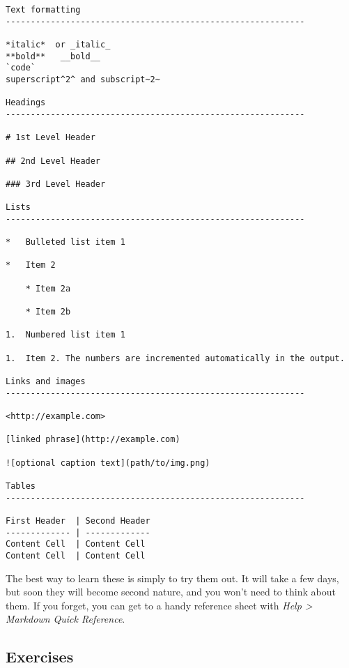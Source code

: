 \documentclass[]{book}
\begin{document}
\begin{verbatim}
Text formatting 
------------------------------------------------------------

*italic*  or _italic_
**bold**   __bold__
`code`
superscript^2^ and subscript~2~

Headings
------------------------------------------------------------

# 1st Level Header

## 2nd Level Header

### 3rd Level Header

Lists
------------------------------------------------------------

*   Bulleted list item 1

*   Item 2

    * Item 2a

    * Item 2b

1.  Numbered list item 1

1.  Item 2. The numbers are incremented automatically in the output.

Links and images
------------------------------------------------------------

<http://example.com>

[linked phrase](http://example.com)

![optional caption text](path/to/img.png)

Tables 
------------------------------------------------------------

First Header  | Second Header
------------- | -------------
Content Cell  | Content Cell
Content Cell  | Content Cell
\end{verbatim}

The best way to learn these is simply to try them out. It will take a
few days, but soon they will become second nature, and you won't need to
think about them. If you forget, you can get to a handy reference sheet
with \emph{Help \textgreater{} Markdown Quick Reference}.

\subsection{Exercises}\label{exercises-69}
\end{document}
